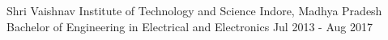 \documentclass{my_resume}
\begin{document}
	\begin{cventries}
		\cventry
			{Shri Vaishnav Institute of Technology and Science} %
			{Indore, Madhya Pradesh} %
			{Bachelor of Engineering in Electrical and Electronics} %
			{Jul 2013 - Aug 2017} %
	\end{cventries}
\end{document}
